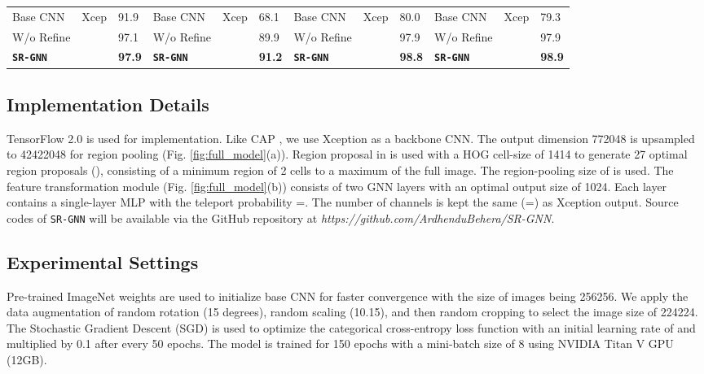 \documentclass[journal]{IEEEtran}
\begin{document}
\begin{table*}[t]
\begin{small}
\begin{tabular}{|p{1.7 cm} p{8 mm} p{5 mm}|p{1.7 cm} p{8 mm} p{5 mm}|p{1.8 cm} p{8 mm} p{5 mm}|p{1.9 cm} p{13 mm} p{5 mm}|}
         \hline
 Base CNN & Xcep & 91.9 &   Base CNN & Xcep& 68.1 & Base CNN &Xcep  &  80.0 & Base CNN  & Xcep & 79.3\\
 W/o Refine &  &97.1 & W/o Refine &  &89.9 & W/o Refine &  & 97.9 & W/o Refine &  & 97.9 \\
\textbf{\texttt{SR-GNN}} &  & \textbf{97.9}  & \textbf{\texttt{SR-GNN}} &  & \textbf{91.2} & \textbf{\texttt{SR-GNN}} &  & \textbf{98.8} &\textbf{\texttt{SR-GNN}} & & \textbf{98.9} \\
    \hline  
  \end{tabular}
  \end{small}
\vspace{-0.5cm}
\end{table*}
\vspace{-0.3 cm}
\subsection {Implementation Details} TensorFlow 2.0 is used for implementation. Like CAP \cite{behera2021context}, we use Xception \cite{chollet2017xception} as a backbone CNN. The output dimension 772048 is upsampled to 42422048
for region pooling (Fig. \ref{fig:full_model}(a)). Region proposal in \cite{behera2020regional} is used with a HOG cell-size of 1414 to generate 27 optimal region proposals (), consisting of a minimum region of 2 cells to a maximum of the full image. The region-pooling size of  is used. The feature transformation module (Fig. \ref{fig:full_model}(b)) consists of two GNN layers with an optimal output size of 1024. Each layer contains a single-layer MLP with the teleport probability =. The number of channels  is  kept the same (=) as  Xception output. Source codes of \texttt{SR-GNN} will be available via the GitHub repository at \textit{https://github.com/ArdhenduBehera/SR-GNN}.

\vspace{ -0.2  cm}
\subsection {Experimental Settings}
Pre-trained ImageNet weights are used to initialize base CNN for faster convergence with the size of images being 256256. We apply the data augmentation of random rotation (15 degrees), random scaling (10.15), and then random cropping to select the image size of 224224. The Stochastic Gradient Descent (SGD) is used to optimize the categorical cross-entropy loss function with an  initial learning rate of  and multiplied by 0.1 after every 50 epochs. The model is trained for 150 epochs with a mini-batch size of 8 using NVIDIA Titan V GPU (12GB). 
\end{document}
